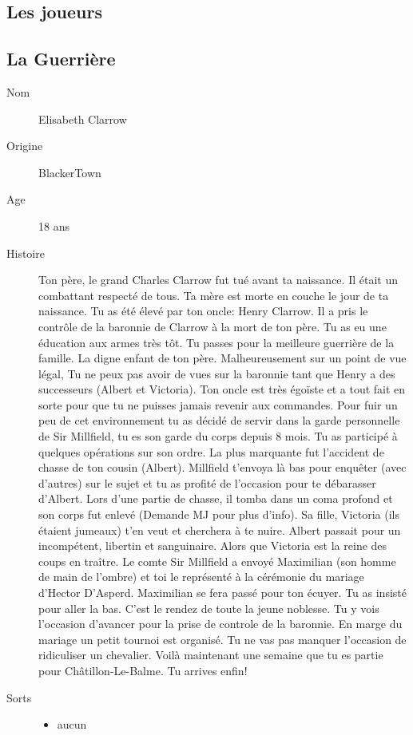 \documentclass[oneside,12pt]{book}
\begin{document}
\begin{flushleft}
\clearpage

\section{Les joueurs}
\subsection{La Guerrière}
\begin{description}
\item[Nom]{ Elisabeth Clarrow}
\item[Origine]{BlackerTown}
\item[Age]{ 18 ans}
\item[Histoire]{Ton père, le grand Charles Clarrow fut tué avant ta naissance. Il était un combattant respecté de tous. Ta mère est morte en couche le jour de ta naissance. Tu as été élevé par ton oncle: Henry Clarrow. Il a pris le contrôle de la baronnie de Clarrow à la mort de ton père. Tu as eu une éducation aux armes très tôt. Tu passes pour la meilleure guerrière de la famille. La digne enfant de ton père. Malheureusement sur un point de vue légal, Tu ne peux pas avoir de vues sur la baronnie tant que Henry a des successeurs (Albert et Victoria). Ton oncle est très égoïste et a tout fait en sorte pour que tu ne puisses jamais revenir aux commandes. Pour fuir un peu de cet environnement tu as décidé de servir dans la garde personnelle de Sir Millfield, tu es son garde du corps depuis 8 mois. Tu as participé à quelques opérations sur son ordre. La plus marquante fut l'accident de chasse de ton cousin (Albert). Millfield t'envoya là bas pour enquêter (avec d'autres) sur le sujet et tu as profité de l'occasion pour te débarasser d'Albert.
Lors d'une partie de chasse, il tomba dans un coma profond et son corps fut enlevé (Demande MJ pour plus d'info).  Sa fille, Victoria (ils étaient jumeaux) t'en veut et cherchera à te nuire. Albert passait pour un incompétent, libertin et sanguinaire. Alors que Victoria est la reine des coups en traître. 
Le comte Sir Millfield a envoyé  Maximilian (son homme de main de l'ombre) et toi le représenté à la cérémonie du mariage d'Hector D'Asperd. Maximilian se fera passé pour ton écuyer. Tu as insisté pour aller la bas. C'est le rendez de toute la jeune noblesse. Tu y vois l'occasion d'avancer pour la prise de controle de la baronnie. En marge du mariage un petit tournoi est organisé. Tu ne vas pas manquer l'occasion de ridiculiser un chevalier. Voilà maintenant une semaine que tu es partie pour Châtillon-Le-Balme. Tu arrives enfin!}
\item[Sorts]{
\begin{itemize}
\item aucun
\end{itemize}
}
\end{description}
\clearpage


\end{flushleft}
\end{document}
